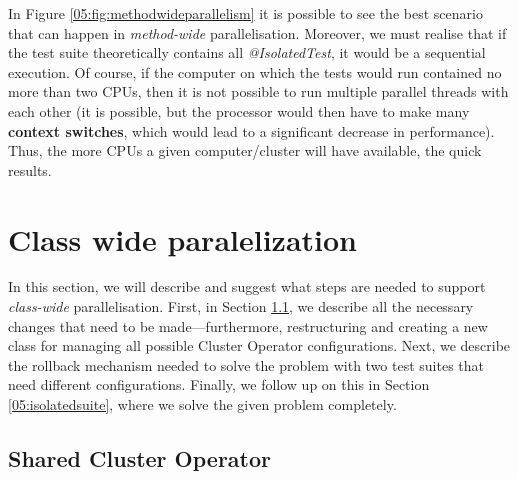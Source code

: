 In Figure \ref {05:fig:methodwideparallelism} it is possible to see the best scenario that can happen in \emph {method-wide} parallelisation. Moreover, we must realise that if the test suite theoretically contains all \emph{@IsolatedTest}, it would be a sequential execution. Of course, if the computer on which the tests would run contained no more than two CPUs, then it is not possible to run multiple parallel threads with each other (it is possible, but the processor would then have to make many \textbf{context switches}, which would lead to a significant decrease in performance). Thus, the more CPUs a given computer/cluster will have available, the quick results.

\section{Class wide paralelization}
\label{04:classwideparalelisation}

In this section, we will describe and suggest what steps are needed to support \emph{class-wide} parallelisation. First, in Section \ref{05:sharedclusteroperator}, we describe all the necessary changes that need to be made—furthermore, restructuring and creating a new class for managing all possible Cluster Operator configurations. Next, we describe the rollback mechanism needed to solve the problem with two test suites that need different configurations. Finally, we follow up on this in Section \ref{05:isolatedsuite}, where we solve the given problem completely.

\subsection{Shared Cluster Operator}
\label{05:sharedclusteroperator}

